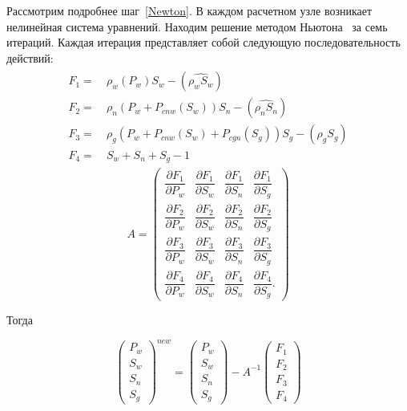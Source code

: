 Рассмотрим подробнее шаг~\ref{Newton}. В каждом расчетном узле возникает 
нелинейная система уравнений.
Находим решение методом Ньютона~\cite{Kalitkin} за семь
итераций. Каждая итерация 
представляет собой следующую последовательность действий:
\begin{eqnarray*}
  \begin{aligned}
    F_1=\ &\rho_w(P_w) S_w - (\widehat{\rho_w S_w}) \\
    F_2=\ &\rho_n(P_w+P_{cnw}(S_w)) S_n - (\widehat{\rho_n S_n}) \\
    F_3=\ &\rho_g(P_w+P_{cnw}(S_w)+P_{cgn}(S_g)) S_g - (\widehat{\rho_g S_g}) \\
    F_4=\ &S_w+S_n+S_g - 1
  \end{aligned}
\end{eqnarray*}
\begin{equation}
A=
\begin{pmatrix}
\dfrac{\partial{F_1}}{\partial{P_w}} & \dfrac{\partial{F_1}}{\partial{S_w}} & \dfrac{\partial{F_1}}{\partial{S_n}} & \dfrac{\partial{F_1}}{\partial{S_g}} \\[3mm]
\dfrac{\partial{F_2}}{\partial{P_w}} & \dfrac{\partial{F_2}}{\partial{S_w}} & \dfrac{\partial{F_2}}{\partial{S_n}} & \dfrac{\partial{F_2}}{\partial{S_g}} \\[3mm]
\dfrac{\partial{F_3}}{\partial{P_w}} & \dfrac{\partial{F_3}}{\partial{S_w}} & \dfrac{\partial{F_3}}{\partial{S_n}} & \dfrac{\partial{F_3}}{\partial{S_g}} \\[3mm]
\dfrac{\partial{F_4}}{\partial{P_w}} & \dfrac{\partial{F_4}}{\partial{S_w}} & \dfrac{\partial{F_4}}{\partial{S_n}} & \dfrac{\partial{F_4}}{\partial{S_g}}.
\end{pmatrix}
\end{equation}

Тогда

\begin{equation}
\begin{pmatrix}
P_w\\
S_w\\
S_n\\
S_g
\end{pmatrix}^{new}
=
\begin{pmatrix}
P_w\\
S_w\\
S_n\\
S_g
\end{pmatrix}
-A^{-1}
\begin{pmatrix}
F_1\\
F_2\\
F_3\\
F_4
\end{pmatrix}
\end{equation}\\

